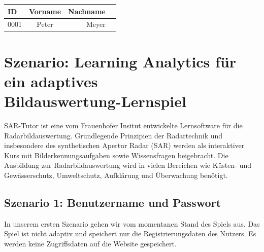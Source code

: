 \documentclass[a4paper, 12pt]{article}
\begin{document}
\begin{tabular}{lcrr}
	
	ID & Vorname & Nachname\\
	\hline
	0001 & Peter & Meyer
	
\end{tabular}

\section{Szenario: Learning Analytics für ein adaptives \\Bildauswertung-Lernspiel}

SAR-Tutor ist eine vom Frauenhofer Insitut entwickelte Lernsoftware für die Radarbildauswertung. Grundlegende Prinzipien der Radartechnik und insbesondere des synthetischen Apertur Radar (SAR) werden als interaktiver Kurs mit Bilderkennungsaufgaben sowie Wissensfragen beigebracht. Die Ausbildung zur Radarbildauswertung wird in vielen Bereichen wie Küsten- und Gewässerschutz, Umweltschutz, Aufklärung und Überwachung benötigt. \\

\subsection{Szenario 1: Benutzername und Passwort}
In unserem ersten Szenario gehen wir vom momentanen Stand des Spiels aus. Das Spiel ist nicht adaptiv und speichert nur die Registrierungsdaten des Nutzers. Es werden keine Zugriffsdaten auf die Website gespeichert.\\
\end{document}
